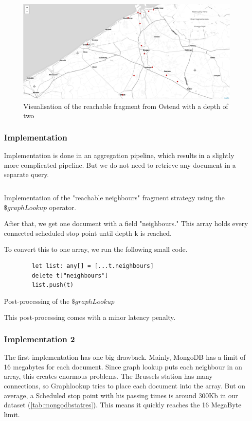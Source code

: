 \begin{figure}[H]
    \centering
    \includegraphics[width=\textwidth]{images/reacable visualized.png}
    \caption{Visualisation of the reachable fragment from Ostend with a depth of two}
    \label{fig:reachable-visualized}
\end{figure}

\subsubsection{Implementation}
Implementation is done in an aggregation pipeline, which results in a slightly more complicated pipeline. But we do not need to retrieve any document in a separate query. 

\begin{listing}[H]
    \inputminted[linenos,frame=single,breaklines]{TypeScript}{code/reachable.ts}
    \caption{Implementation of the "reachable neighbours" fragment strategy using the \\$\$graphLookup$ operator.}
\end{listing}

After that, we get one document with a field "neighbours." This array holds every connected scheduled stop point until depth k is reached. 

To convert this to one array, we run the following small code. 
\begin{listing}[H]
    \begin{verbatim}
        let list: any[] = [...t.neighbours]
        delete t["neighbours"]
        list.push(t)
    \end{verbatim}
    \caption{Post-processing of the $\$graphLookup$}
\end{listing}

This post-processing comes with a minor latency penalty.

\subsubsection{Implementation 2}
The first implementation has one big drawback. Mainly, MongoDB has a  limit of 16 megabytes for each document. Since graph lookup puts each neighbour in an array, this creates enormous problems. The Brussels station has many connections, so Graphlookup tries to place each document into the array. But on average, a Scheduled stop point with his passing times is around 300Kb in our dataset (\autoref{tab:mongodbstatres}). This means it quickly reaches the 16 MegaByte limit. 

